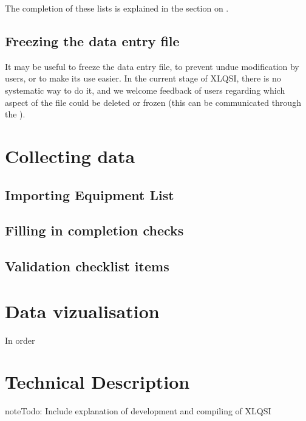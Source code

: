 \documentclass[letterpaper,10pt,english]{sphinxmanual}
\begin{document}
The completion of these lists is explained in the section on {\hyperref[\detokenize{fill_data_entry::doc}]{}}.


\section{Freezing the data entry file}
\label{\detokenize{create_data_entry:freezing-the-data-entry-file}}
It may be useful to freeze the data entry file, to prevent undue modification by users, or to make its use easier. In the current stage of XLQSI, there is no systematic way to do it, and we welcome feedback of users regarding which aspect of the file could be deleted or frozen (this can be communicated through the  ).


\chapter{Collecting data}
\label{\detokenize{fill_data_entry::doc}}\label{\detokenize{fill_data_entry:collecting-data}}

\section{Importing Equipment List}
\label{\detokenize{fill_data_entry:importing-equipment-list}}

\section{Filling in completion checks}
\label{\detokenize{fill_data_entry:filling-in-completion-checks}}

\section{Validation checklist items}
\label{\detokenize{fill_data_entry:validation-checklist-items}}

\chapter{Data vizualisation}
\label{\detokenize{data_viz::doc}}\label{\detokenize{data_viz:data-vizualisation}}
In order


\chapter{Technical Description}
\label{\detokenize{technical::doc}}\label{\detokenize{technical:technical-description}}
\begin{sphinxadmonition}{note}{\label{technical:index-0}Todo:}
Include explanation of development and compiling of XLQSI
\end{sphinxadmonition}
\end{document}
